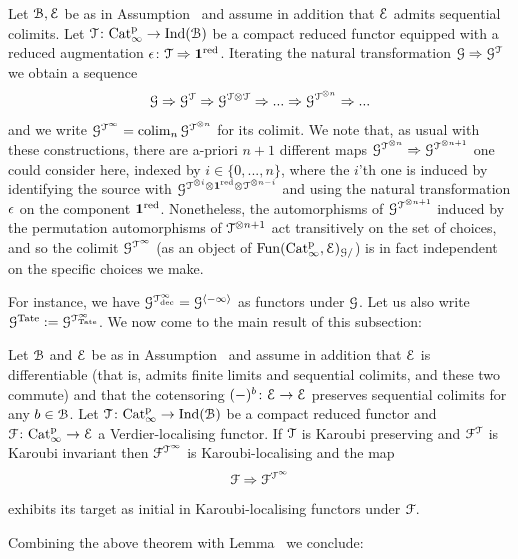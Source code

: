 \begin{construction}
\label{construction:karoubification}%
Let $\mathcal{B},\mathcal{E}$ be as in Assumption~ and assume in addition that $\mathcal{E}$ admits sequential colimits. Let $\mathcal{T}\colon \mathrm{Cat}^{\mathrm p}_\infty \to \operatorname{Ind}(\mathcal{B})$ be a compact reduced functor equipped with a reduced augmentation $\epsilon\colon\mathcal{T} \Rightarrow \mathbf{1}^{\mathrm{red}}$. Iterating the natural transformation $\mathcal{G} \Rightarrow \mathcal{G}^{\mathcal{T}}$ we obtain a sequence
\[
\mathcal{G} \Rightarrow \mathcal{G}^{\mathcal{T}} \Rightarrow \mathcal{G}^{\mathcal{T}\otimes \mathcal{T}} \Rightarrow ... \Rightarrow \mathcal{G}^{\mathcal{T}^{\otimes n}} \Rightarrow ...
\]
and we write $\mathcal{G}^{\mathcal{T}^{\infty}} = \mathop{\mathrm{colim}}_n\mathcal{G}^{\mathcal{T}^{\otimes n}}$ for its colimit.
We note that, as usual with these constructions, there are a-priori $n+1$ different maps $\mathcal{G}^{\mathcal{T}^{\otimes n}} \Rightarrow \mathcal{G}^{\mathcal{T}^{\otimes n+1}}$ one could consider here, indexed by $i \in \{0,...,n\}$, where the $i$'th one is induced by identifying the source with $\mathcal{G}^{\mathcal{T}^{\otimes i}\otimes \mathbf{1}^{\mathrm{red}} \otimes \mathcal{T}^{\otimes n-i}}$ and using the natural transformation $\epsilon$ on the component $\mathbf{1}^{\mathrm{red}}$. 
Nonetheless, the automorphisms of $\mathcal{G}^{\mathcal{T}^{\otimes n+1}}$ induced by the permutation automorphisms of $\mathcal{T}^{\otimes n+1}$ act transitively on the set of choices, and so the colimit $\mathcal{G}^{\mathcal{T}^{\infty}}$ (as an object of $\operatorname{Fun}(\mathrm{Cat}^{\mathrm p}_\infty,\mathcal{E})_{\mathcal{G}/}$) is in fact independent on the specific choices we make.  
\end{construction}

For instance, we have $\mathcal{G}^{\mathcal{T}_{\mathrm{dec}}^{\infty}} = \mathcal{G}^{\langle -\infty \rangle}$ as functors under $\mathcal{G}$. Let us also write $\mathcal{G}^{\operatorname{Tate}} := \mathcal{G}^{\mathcal{T}_{\operatorname{Tate}}^{\infty}}$. We now come to the main result of this subsection:

\begin{theorem}
\label{theorem:karoubification}%
Let $\mathcal{B}$ and $\mathcal{E}$ be as in Assumption~ and assume in addition that $\mathcal{E}$ is differentiable (that is, admits finite limits and sequential colimits, and these two commute) and that the cotensoring $(-)^b\colon \mathcal{E} \to \mathcal{E}$ preserves sequential colimits for any $b \in \mathcal{B}$.
Let $\mathcal{T}\colon \mathrm{Cat}^{\mathrm p}_\infty \to \operatorname{Ind}(\mathcal{B})$ be a compact reduced functor and $\mathcal{F}\colon \mathrm{Cat}^{\mathrm p}_\infty \to \mathcal{E}$ a Verdier-localising functor. If $\mathcal{T}$ is Karoubi preserving and $\mathcal{F}^{\mathcal{T}}$ is Karoubi invariant then $\mathcal{F}^{\mathcal{T}^{\infty}}$ is Karoubi-localising and the map 
\[
\mathcal{F} \Rightarrow \mathcal{F}^{\mathcal{T}^{\infty}}
\]
exhibits its target as initial in Karoubi-localising functors under $\mathcal{F}$.
\end{theorem}

Combining the above theorem with Lemma~ we conclude:

